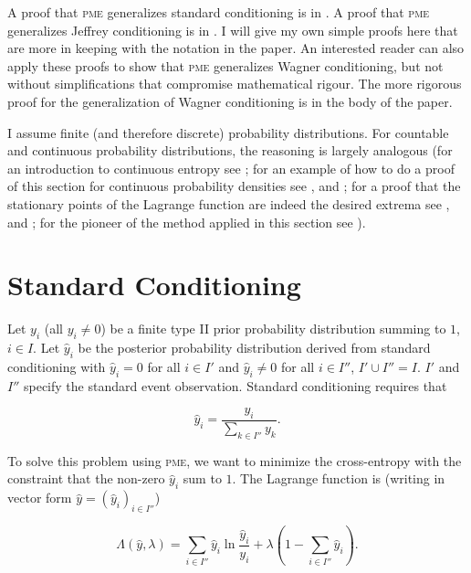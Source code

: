 A proof that \textsc{pme} generalizes standard conditioning is in
. A proof that \textsc{pme} generalizes Jeffrey
conditioning is in . I will give my own simple
proofs here that are more in keeping with the notation in the paper.
An interested reader can also apply these proofs to show that
\textsc{pme} generalizes Wagner conditioning, but not without
simplifications that compromise mathematical rigour. The more rigorous
proof for the generalization of Wagner conditioning is in the body of
the paper.

I assume finite (and therefore discrete) probability distributions.
For countable and continuous probability distributions, the reasoning
is largely analogous (for an introduction to continuous entropy see
; for an example of how to do a proof of this
section for continuous probability densities see
, and ; for a proof
that the stationary points of the Lagrange function are indeed the
desired extrema see , and
; for the pioneer of the method applied
in this section see ).

\section{Standard Conditioning}
\label{sc}

Let $y_{i}$ (all $y_{i}\neq{}0$) be a finite type II prior probability
distribution summing to $1$, $i\in{}I$. Let $\hat{y}_{i}$ be the
posterior probability distribution derived from standard conditioning
with $\hat{y}_{i}=0$ for all $i\in{}I'$ and $\hat{y}_{i}\neq{}0$ for
all $i\in{}I''$, $I'\cup{}I''=I$. $I'$ and $I''$ specify the standard
event observation. Standard conditioning requires that

\begin{equation}
  \label{eq:sc}
  \hat{y}_{i}=\frac{y_{i}}{\sum_{k\in{}I''}y_{k}}.
\end{equation}

{\noindent}To solve this problem using \textsc{pme}, we want to minimize the
cross-entropy with the constraint that the non-zero $\hat{y}_{i}$ sum to
$1$. The Lagrange function is (writing in vector form
$\hat{y}=(\hat{y}_{i})_{i\in{}I''}$)

\begin{equation}
  \label{eq:sclag}
  \Lambda(\hat{y},\lambda)=\sum_{i\in{}I''}\hat{y}_{i}\ln\frac{\hat{y}_{i}}{y_{i}}+\lambda\left(1-\sum_{i\in{}I''}\hat{y}_{i}\right).
\end{equation}

